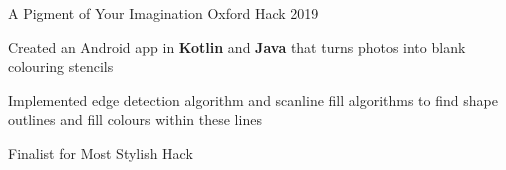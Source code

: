 \begin{cvprojects}

  \cvproject
  {A Pigment of Your Imagination} %
  {Oxford Hack 2019} %
  {
    \begin{cvitems} %
      \item Created an Android app in \textbf{Kotlin} and \textbf{Java} that turns photos into blank colouring stencils
      \item Implemented edge detection algorithm and scanline fill algorithms to find shape outlines and fill colours within these lines
      \item Finalist for Most Stylish Hack
    \end{cvitems}
  }






\end{cvprojects}
